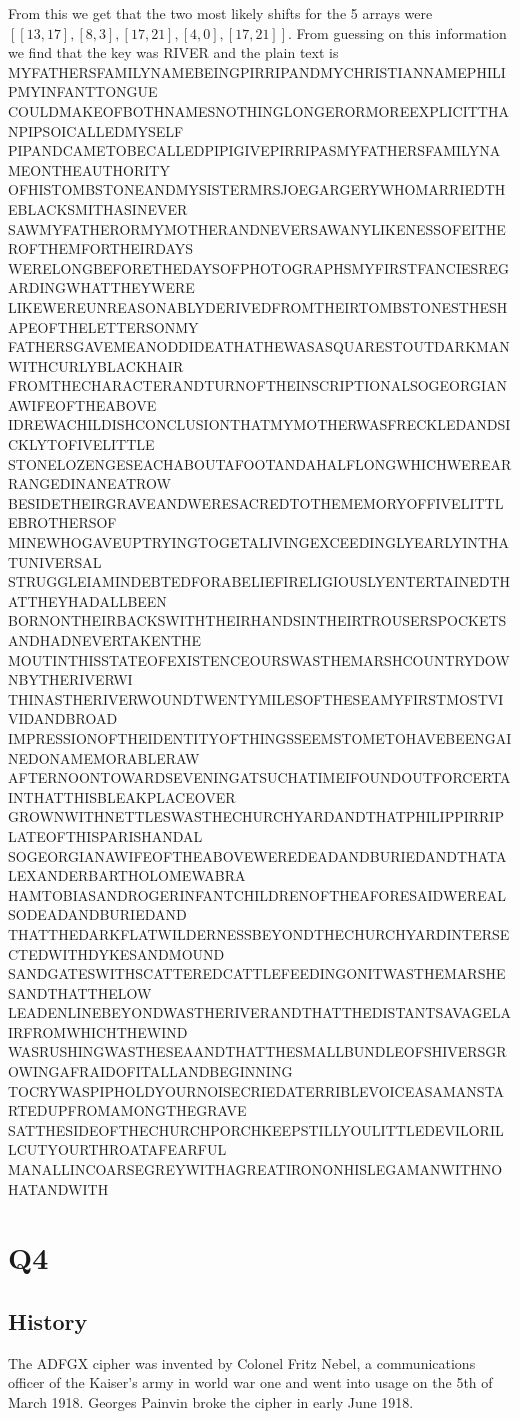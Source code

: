 \documentclass{article}
\begin{document}
From this we get that the two most likely shifts for the 5 arrays were $[[13, 17], [8, 3], [17, 21], [4, 0], [17, 21]]$. From guessing on this information we find that the key was RIVER and the plain text is MYFATHERSFAMILYNAMEBEINGPIRRIPANDMYCHRISTIANNAMEPHILIPMYINFANTTONGUE
COULDMAKEOFBOTHNAMESNOTHINGLONGERORMOREEXPLICITTHANPIPSOICALLEDMYSELF
PIPANDCAMETOBECALLEDPIPIGIVEPIRRIPASMYFATHERSFAMILYNAMEONTHEAUTHORITY
OFHISTOMBSTONEANDMYSISTERMRSJOEGARGERYWHOMARRIEDTHEBLACKSMITHASINEVER
SAWMYFATHERORMYMOTHERANDNEVERSAWANYLIKENESSOFEITHEROFTHEMFORTHEIRDAYS
WERELONGBEFORETHEDAYSOFPHOTOGRAPHSMYFIRSTFANCIESREGARDINGWHATTHEYWERE
LIKEWEREUNREASONABLYDERIVEDFROMTHEIRTOMBSTONESTHESHAPEOFTHELETTERSONMY
FATHERSGAVEMEANODDIDEATHATHEWASASQUARESTOUTDARKMANWITHCURLYBLACKHAIR
FROMTHECHARACTERANDTURNOFTHEINSCRIPTIONALSOGEORGIANAWIFEOFTHEABOVE
IDREWACHILDISHCONCLUSIONTHATMYMOTHERWASFRECKLEDANDSICKLYTOFIVELITTLE
STONELOZENGESEACHABOUTAFOOTANDAHALFLONGWHICHWEREARRANGEDINANEATROW
BESIDETHEIRGRAVEANDWERESACREDTOTHEMEMORYOFFIVELITTLEBROTHERSOF
MINEWHOGAVEUPTRYINGTOGETALIVINGEXCEEDINGLYEARLYINTHATUNIVERSAL
STRUGGLEIAMINDEBTEDFORABELIEFIRELIGIOUSLYENTERTAINEDTHATTHEYHADALLBEEN
BORNONTHEIRBACKSWITHTHEIRHANDSINTHEIRTROUSERSPOCKETSANDHADNEVERTAKENTHE
MOUTINTHISSTATEOFEXISTENCEOURSWASTHEMARSHCOUNTRYDOWNBYTHERIVERWI
THINASTHERIVERWOUNDTWENTYMILESOFTHESEAMYFIRSTMOSTVIVIDANDBROAD
IMPRESSIONOFTHEIDENTITYOFTHINGSSEEMSTOMETOHAVEBEENGAINEDONAMEMORABLERAW
AFTERNOONTOWARDSEVENINGATSUCHATIMEIFOUNDOUTFORCERTAINTHATTHISBLEAKPLACEOVER
GROWNWITHNETTLESWASTHECHURCHYARDANDTHATPHILIPPIRRIPLATEOFTHISPARISHANDAL
SOGEORGIANAWIFEOFTHEABOVEWEREDEADANDBURIEDANDTHATALEXANDERBARTHOLOMEWABRA
HAMTOBIASANDROGERINFANTCHILDRENOFTHEAFORESAIDWEREALSODEADANDBURIEDAND
THATTHEDARKFLATWILDERNESSBEYONDTHECHURCHYARDINTERSECTEDWITHDYKESANDMOUND
SANDGATESWITHSCATTEREDCATTLEFEEDINGONITWASTHEMARSHESANDTHATTHELOW
LEADENLINEBEYONDWASTHERIVERANDTHATTHEDISTANTSAVAGELAIRFROMWHICHTHEWIND
WASRUSHINGWASTHESEAANDTHATTHESMALLBUNDLEOFSHIVERSGROWINGAFRAIDOFITALLANDBEGINNING
TOCRYWASPIPHOLDYOURNOISECRIEDATERRIBLEVOICEASAMANSTARTEDUPFROMAMONGTHEGRAVE
SATTHESIDEOFTHECHURCHPORCHKEEPSTILLYOULITTLEDEVILORILLCUTYOURTHROATAFEARFUL
MANALLINCOARSEGREYWITHAGREATIRONONHISLEGAMANWITHNOHATANDWITH
\section*{Q4}
\subsection*{History}
The ADFGX cipher was invented by Colonel Fritz Nebel, a communications officer of the Kaiser's army in world war one and went into usage on the 5th of March 1918. Georges Painvin broke the cipher in early June 1918.
\end{document}
